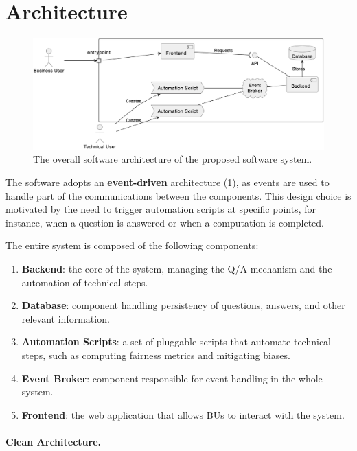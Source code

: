 \documentclass[12pt,a4paper,openright,twoside]{book}
\begin{document}
\section{Architecture}

\begin{figure}
    \centering
    \includegraphics[width=\linewidth]{figures/diagrams/architecture.png}
    \caption{
        The overall software architecture of the proposed software system.
    }
    \label{fig:architecture}
\end{figure}

The software adopts an \textbf{event-driven} architecture (\cref{fig:architecture}), as events are used to handle part of the communications between the components.
%
This design choice is motivated by the need to trigger automation scripts at specific points, for instance, when a question is answered or when a computation is completed.

The entire system is composed of the following components:
\begin{enumerate}
    \item \textbf{Backend}: the core of the system, managing the \ac{Q/A} mechanism and the automation of technical steps.
    \item \textbf{Database}: component handling persistency of questions, answers, and other relevant information.
    \item \textbf{Automation Scripts}: a set of pluggable scripts that automate technical steps, such as computing fairness metrics and mitigating biases.
    \item \textbf{Event Broker}: component responsible for event handling in the whole system.
    \item \textbf{Frontend}: the web application that allows \acp{BU} to interact with the system.
\end{enumerate}

\paragraph{Clean Architecture.}
\end{document}
